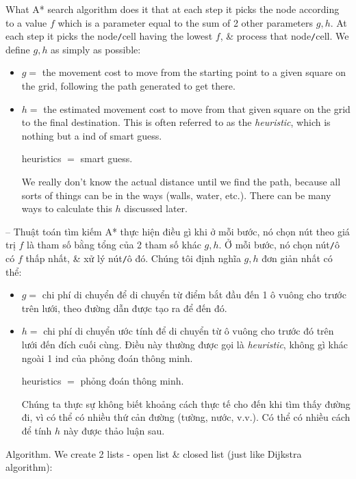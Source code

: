 \documentclass{article}
\begin{document}
What A* search algorithm does it that at each step it picks the node according to a value $f$ which is a parameter equal to the sum of 2 other parameters $g,h$. At each step it picks the node{\tt/}cell having the lowest $f$, \& process that node{\tt/}cell. We define $g,h$ as simply as possible:
\begin{itemize}
    \item $g =$ the movement cost to move from the starting point to a given square on the grid, following the path generated to get there.
    \item $h=$ the estimated movement cost to move from that given square on the grid to the final destination. This is often referred to as the {\it heuristic}, which is nothing but a ind of smart guess.
    \begin{center}
        heuristics $=$ smart guess.
    \end{center}
    We really don't know the actual distance until we find the path, because all sorts of things can be in the ways (walls, water, etc.). There can be many ways to calculate this $h$ discussed later.
\end{itemize}
-- Thuật toán tìm kiếm A* thực hiện điều gì khi ở mỗi bước, nó chọn nút theo giá trị $f$ là tham số bằng tổng của 2 tham số khác $g,h$. Ở mỗi bước, nó chọn nút{\tt/}ô có $f$ thấp nhất, \& xử lý nút{\tt/}ô đó. Chúng tôi định nghĩa $g,h$ đơn giản nhất có thể:
\begin{itemize}
    \item $g =$ chi phí di chuyển để di chuyển từ điểm bắt đầu đến 1 ô vuông cho trước trên lưới, theo đường dẫn được tạo ra để đến đó.
    \item $h=$ chi phí di chuyển ước tính để di chuyển từ ô vuông cho trước đó trên lưới đến đích cuối cùng. Điều này thường được gọi là {\it heuristic}, không gì khác ngoài 1 ind của phỏng đoán thông minh.
    \begin{center}
        heuristics $=$ phỏng đoán thông minh.
    \end{center}
    Chúng ta thực sự không biết khoảng cách thực tế cho đến khi tìm thấy đường đi, vì có thể có nhiều thứ cản đường (tường, nước, v.v.). Có thể có nhiều cách để tính $h$ này được thảo luận sau.
\end{itemize}
{\sf Algorithm.} We create 2 lists - open list \& closed list (just like Dijkstra algorithm):
\end{document}
